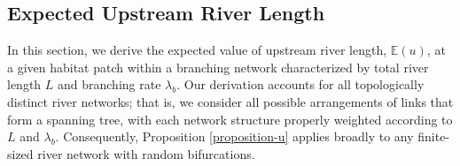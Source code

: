\documentclass[11pt, class=article, crop=false]{standalone}
\theoremstyle{definition}
\begin{document}
\newpage

\subsection{Expected Upstream River Length} \label{updist}

In this section, we derive the expected value of upstream river length, $\mathbb{E}(u)$, at a given habitat patch within a branching network characterized by total river length $L$ and branching rate $\lambda_b$.
Our derivation accounts for all topologically distinct river networks; that is, we consider all possible arrangements of links that form a spanning tree, with each network structure properly weighted according to $L$ and $\lambda_b$.
Consequently, Proposition \ref{proposition-u} applies broadly to any finite-sized river network with random bifurcations. 
\end{document}
